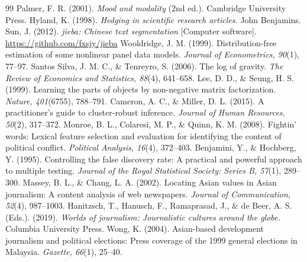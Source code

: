 \documentclass[11pt]{article}
\begin{document}
\begin{thebibliography}{99}
 Palmer, F. R. (2001). \textit{Mood and modality} (2nd ed.). Cambridge University Press.
 Hyland, K. (1998). \textit{Hedging in scientific research articles.} John Benjamins.
 Sun, J. (2012). \textit{jieba: Chinese text segmentation} [Computer software]. \url{https://github.com/fxsjy/jieba}
 Wooldridge, J. M. (1999). Distribution-free estimation of some nonlinear panel data models. \textit{Journal of Econometrics, 90}(1), 77--97.
 Santos Silva, J. M. C., \& Tenreyro, S. (2006). The log of gravity. \textit{The Review of Economics and Statistics, 88}(4), 641--658.
 Lee, D. D., \& Seung, H. S. (1999). Learning the parts of objects by non-negative matrix factorization. \textit{Nature, 401}(6755), 788--791.
 Cameron, A. C., \& Miller, D. L. (2015). A practitioner's guide to cluster-robust inference. \textit{Journal of Human Resources, 50}(2), 317--372.
 Monroe, B. L., Colaresi, M. P., \& Quinn, K. M. (2008). Fightin' words: Lexical feature selection and evaluation for identifying the content of political conflict. \textit{Political Analysis, 16}(4), 372--403.
 Benjamini, Y., \& Hochberg, Y. (1995). Controlling the false discovery rate: A practical and powerful approach to multiple testing. \textit{Journal of the Royal Statistical Society: Series B, 57}(1), 289--300.
 Massey, B. L., \& Chang, L. A. (2002). Locating Asian values in Asian journalism: A content analysis of web newspapers. \textit{Journal of Communication, 52}(4), 987--1003.
 Hanitzsch, T., Hanusch, F., Ramaprasad, J., \& de Beer, A. S. (Eds.). (2019). \textit{Worlds of journalism: Journalistic cultures around the globe.} Columbia University Press.
 Wong, K. (2004). Asian-based development journalism and political elections: Press coverage of the 1999 general elections in Malaysia. \textit{Gazette, 66}(1), 25--40.
\end{thebibliography}
\end{document}
